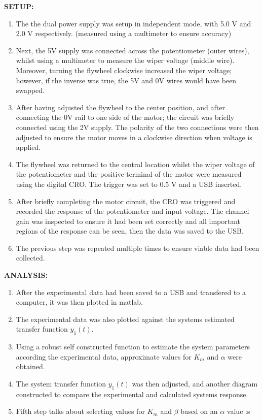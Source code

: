 \documentclass[11pt,a4paper]{article}
\begin{document}
\textbf{SETUP:}
\begin{enumerate}
  \item The the dual power supply was setup in independent mode, with 5.0 V and 2.0 V respectively. (measured using a multimeter to ensure accuracy)
  \item Next, the 5V supply was connected across the potentiometer (outer wires), whilst using a multimeter to measure the wiper voltage (middle wire). Moreover, turning the flywheel clockwise increased the wiper voltage; however, if the inverse was true, the 5V and 0V wires would have been swapped.
  \item After having adjusted the flywheel to the center position, and after connecting the 0V rail to one side of the motor; the circuit was briefly connected using the 2V supply. The polarity of the two connections were then adjusted to ensure the motor moves in a clockwise direction when voltage is applied. 
  \item The flywheel was returned to the central location whilst the wiper voltage of the potentiometer and the positive terminal of the motor were measured using the digital CRO. The trigger was set to 0.5 V and a USB inserted. 
  \item After briefly completing the motor circuit, the CRO was triggered and recorded the response of the potentiometer and input voltage. The channel gain was inspected to ensure it had been set correctly and all important regions of the response can be seen, then the data was saved to the USB.
  \item The previous step was repeated multiple times to ensure viable data had been collected. \\
\end{enumerate} 

\textbf{ANALYSIS:}
\begin{enumerate}
  \item After the experimental data had been saved to a USB and transfered to a computer, it was then plotted in matlab.
  \item The experimental data was also plotted against the systems estimated transfer function $y_1(t)$. 
  \item Using a robust self constructed function to estimate the system parameters according the experimental data, approximate values for $K_m$ and $\alpha$ were obtained. 
  \item The system transfer function $y_1(t)$ was then adjusted, and another diagram constructed to compare the experimental and calculated systems response.
  \item Fifth step talks about selecting values for $K_m$ and $\beta$ based on an $\alpha$ value :s

\end{enumerate} 
\end{document}
